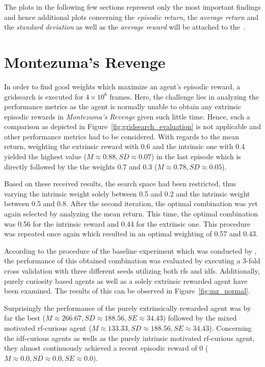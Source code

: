 \documentclass[draft,final]{vutinfth} %
\begin{document}
    The plots in the following few sections represent only the most important findings and hence additional plots concerning the \textit{episodic return}, the \textit{average return} and the \textit{standard deviation} as well as the \textit{average reward} will be attached to the~.


    \section{Montezuma's Revenge}

    In order to find good weights which maximize an agent's episodic reward, a gridsearch is executed for $4 \times 10^6$ frames.
    Here, the challenge lies in analyzing the performance metrics as the agent is normally unable to obtain any extrinsic episodic rewards in \textit{Montezuma's Revenge} given such little time.
    Hence, such a comparison as depicted in Figure~\ref{fig:gridsearch_evaluation} is not applicable and other performance metrics had to be considered.
    With regards to the mean return, weighting the extrinsic reward with 0.6 and the intrinsic one with 0.4 yielded the highest value ($M\approx0.88,SD\approx0.07$) in the last episode which is directly followed by the the weights 0.7 and 0.3 ($M\approx0.78,SD\approx0.05$).

    Based on these received results, the search space had been restricted, thus varying the intrinsic weight solely between 0.5 and 0.2 and the intrinsic weight between 0.5 and 0.8.
    After the second iteration, the optimal combination was yet again selected by analyzing the mean return.
    This time, the optimal combination was 0.56 for the intrinsic reward and 0.44 for the extrinsic one.
    This procedure was repeated once again which resulted in an optimal weighting of 0.57 and 0.43.

    According to the procedure of the baseline experiment which was conducted by \citet{burda_large-scale_2018-1}, the performance of this obtained combination was evaluated by executing a 3-fold cross validation with three different seeds utilizing both \glspl{rf} and \glspl{idf}.
    Additionally, purely curiosity based agents as well as a solely extrinsic rewarded agent have been examined.
    The results of this can be observed in Figure~\ref{fig:mz_normal}.

    Surprisingly the performance of the purely extrinsically rewarded agent was by far the best ($M\approx266.67,SD\approx188.56,SE\approx34.43$) followed by the mixed motivated \gls{rf}-curious agent ($M\approx133.33,SD\approx188.56,SE\approx34.43$).
    Concerning the \gls{idf}-curious agents as wells as the purely intrinsic motivated \gls{rf}-curious agent, they almost continuously achieved a recent episodic reward of 0 ($M\approx0.0,SD\approx0.0,SE\approx0.0$).
\end{document}
